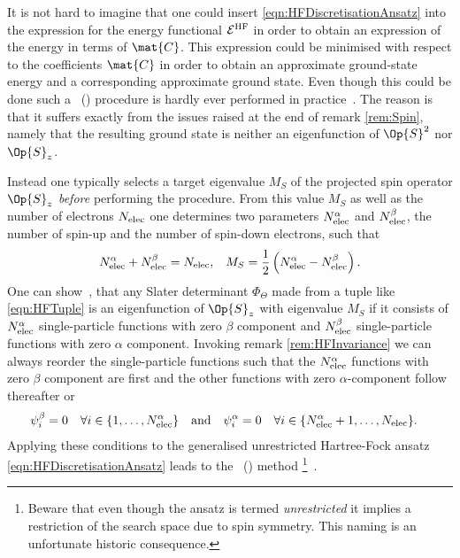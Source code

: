 \begin{rem}
	It is not hard to imagine
	that one could insert \eqref{eqn:HFDiscretisationAnsatz}
	into the expression for the \HF energy functional $\mathcal{E}^\text{HF}$
	in order to obtain an expression of the \HF energy
	in terms of $\mat{C}$.
	This expression could be minimised
	with respect to the coefficients $\mat{C}$
	in order to obtain an approximate
	\HF ground-state energy and a corresponding approximate \HF ground state.
	Even though this could be done
	such a ~(\GUHF)
	procedure is hardly ever performed in practice~\cite{McWeeny1985}.
	The reason is that it suffers
	exactly from the issues raised at the end of remark \vref{rem:Spin},
	namely that the resulting \HF ground state
	is neither an eigenfunction of $\Op{S}^2$ nor $\Op{S}_z$.

	Instead one typically selects a target eigenvalue $M_S$
	of the projected spin operator $\Op{S}_z$ \emph{before}
	performing the \HF procedure.
	From this value $M_S$ as well as the number of electrons
	$N_\text{elec}$ one determines two parameters
	$N_\text{elec}^\alpha$ and $N_\text{elec}^\beta$,
	the number of spin-up and the number of spin-down electrons,
	such that
	\begin{align*}
		N_\text{elec}^\alpha + N_\text{elec}^\beta &= N_\text{elec}, & M_S = \frac12 \left( N_\text{elec}^\alpha - N_\text{elec}^\beta\right).
	\end{align*}
	One can show~\cite{Szabo1996,Helgaker2013},
	that any Slater determinant $\Phi_\Theta$
	made from a tuple like \eqref{eqn:HFTuple}
	is an eigenfunction of $\Op{S}_z$ with eigenvalue $M_S$
	if it consists of $N_\text{elec}^\alpha$ single-particle functions with zero $\beta$
	component and $N_\text{elec}^\beta$ single-particle functions with zero $\alpha$ component.
	Invoking remark \vref{rem:HFInvariance}
	we can always reorder the single-particle functions
	such that the $N_\text{elec}^\alpha$ functions with zero $\beta$ component are first
	and the other functions with zero $\alpha$-component follow thereafter
	or
	\begin{align*}
		\psi_i^\beta  &= 0 \quad \forall i \in \{1,\ldots,N_\text{elec}^\alpha\}
		&&\text{and}&
		\psi_i^\alpha  &= 0 \quad \forall i \in \{N_\text{elec}^\alpha+1,\ldots,N_\text{elec}\}.
	\end{align*}
	Applying these conditions
	to the generalised unrestricted Hartree-Fock ansatz \eqref{eqn:HFDiscretisationAnsatz}
	leads to the ~(\UHF) method%
	\footnote{
		Beware that even though the \UHF ansatz is termed \emph{unrestricted}
		it implies a restriction of the search space due to spin symmetry.
		This naming is an unfortunate historic consequence.
	}~\cite{Pople1954}.

\end{rem}
